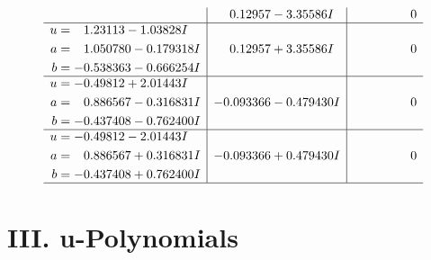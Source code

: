 \documentclass[1p]{elsarticle_modified}
\theoremstyle{definition}
\begin{document}
$$\begin{array}{c|c|c}
 & \phantom{-}0.12957 - 3.35586 I & \phantom{-0.000000 } 0 \\ \hline\begin{aligned}
u &= \phantom{-}1.23113 - 1.03828 I \\
a &= \phantom{-}1.050780 - 0.179318 I \\
b &= -0.538363 - 0.666254 I\end{aligned}
 & \phantom{-}0.12957 + 3.35586 I & \phantom{-0.000000 } 0 \\ \hline\begin{aligned}
u &= -0.49812 + 2.01443 I \\
a &= \phantom{-}0.886567 - 0.316831 I \\
b &= -0.437408 - 0.762400 I\end{aligned}
 & -0.093366 - 0.479430 I & \phantom{-0.000000 } 0 \\ \hline\begin{aligned}
u &= -0.49812 - 2.01443 I \\
a &= \phantom{-}0.886567 + 0.316831 I \\
b &= -0.437408 + 0.762400 I\end{aligned}
 & -0.093366 + 0.479430 I & \phantom{-0.000000 } 0\\
 \hline 
 \end{array}$$\newpage
\newpage\renewcommand{\arraystretch}{1}
\centering \section*{ III. u-Polynomials}
\end{document}
